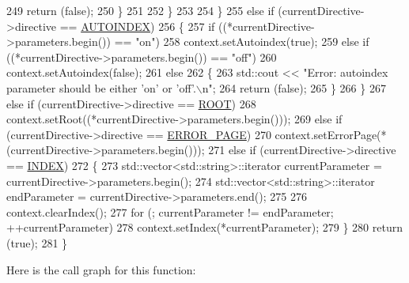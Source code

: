 \begin{DoxyCode}
249                     \textcolor{keywordflow}{return} (\textcolor{keyword}{false});
250                 \}
251 
252             \}
253 
254         \}
255         \textcolor{keywordflow}{else} \textcolor{keywordflow}{if} (currentDirective->directive == \hyperlink{namespaceft_a5a5554dff10f0dc50bae4cc5825ad75da8ce880864e00bec4865ba027e32a466c}{AUTOINDEX})
256         \{
257             \textcolor{keywordflow}{if} ((*currentDirective->parameters.begin()) == \textcolor{stringliteral}{"on"})
258                 context.setAutoindex(\textcolor{keyword}{true});
259             \textcolor{keywordflow}{else} \textcolor{keywordflow}{if} ((*currentDirective->parameters.begin()) == \textcolor{stringliteral}{"off"})
260                 context.setAutoindex(\textcolor{keyword}{false});
261             \textcolor{keywordflow}{else}
262             \{
263                 std::cout << \textcolor{stringliteral}{"Error: autoindex parameter should be either 'on' or 'off'.\(\backslash\)n"};
264                 \textcolor{keywordflow}{return} (\textcolor{keyword}{false});
265             \}
266         \}
267         \textcolor{keywordflow}{else} \textcolor{keywordflow}{if} (currentDirective->directive == \hyperlink{namespaceft_a5a5554dff10f0dc50bae4cc5825ad75dad41208b99e347d1726824779b11ea11b}{ROOT})
268             context.setRoot((*currentDirective->parameters.begin()));
269         \textcolor{keywordflow}{else} \textcolor{keywordflow}{if} (currentDirective->directive == \hyperlink{namespaceft_a5a5554dff10f0dc50bae4cc5825ad75da69c9592b502329f43c77ad043a13e6d9}{ERROR\_PAGE})
270             context.setErrorPage(*(currentDirective->parameters.begin()));
271         \textcolor{keywordflow}{else} \textcolor{keywordflow}{if} (currentDirective->directive == \hyperlink{namespaceft_a5a5554dff10f0dc50bae4cc5825ad75da5f0c05bad71a7b0dd266aae7ce4b3579}{INDEX})
272         \{
273             std::vector<std::string>::iterator  currentParameter = currentDirective->parameters.begin();
274             std::vector<std::string>::iterator      endParameter = currentDirective->parameters.end();
275 
276             context.clearIndex();
277             \textcolor{keywordflow}{for} (; currentParameter != endParameter; ++currentParameter)
278                 context.setIndex(*currentParameter);
279         \}
280         \textcolor{keywordflow}{return} (\textcolor{keyword}{true});
281     \}
\end{DoxyCode}
Here is the call graph for this function\+:
\nopagebreak
